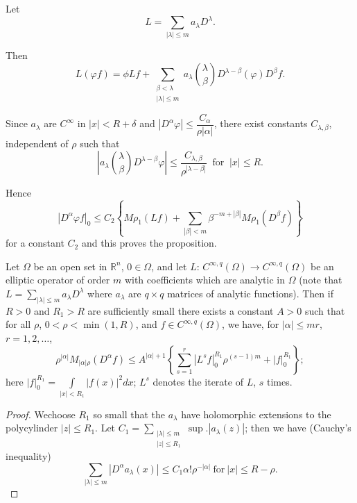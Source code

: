 Let\pageoriginale 
$$
L = \sum_{|\lambda| \leq m} a_\lambda D^\lambda.
$$ 

Then
$$
L(\varphi f ) = \phi Lf + \sum_{\substack{\beta < \lambda \\ | \lambda
    | \leq m}} a_\lambda \binom{\lambda}{\beta} D^ {\lambda - \beta}
(\varphi ) D^ \beta f . 
$$

Since $a_ \lambda$ are $C^ \infty$ in $| x | < R + \delta$ and $| D^
\alpha \varphi | \leq \dfrac{C_ \alpha}{\rho |\alpha|}$, there exist
constants $C_{\lambda , \beta}$, independent of $\rho$ such that 
$$
| a_ \lambda \binom{\lambda}{\beta} D^ {\lambda - \beta} \varphi | \leq
\frac{C_ {\lambda, \beta}}{\rho^{|\lambda- \beta|}} ~ \text{ for } ~
|x| \leq R. 
$$

Hence
$$
|D^ \alpha \varphi f |_0 \leq C_2 \left\{ M \rho_1 (Lf) + \sum_{|\beta| <
  m} \beta^{-m+ |\beta|} M \rho_1 (D^ \beta f) \right\} 
$$
for a constant $C_2$ and this proves the proposition.

\begin{proposition}\label{chap3:sec8:prop2}%
  Let $\Omega$ be an open set in $\mathbb{R}^n$, $0 \in \Omega$, and
  let $L$: $C^ {\infty , q} (\Omega ) \to C^{\infty, q} (\Omega)$ be
  an elliptic operator of order $m$ with coefficients which are
  analytic in $\Omega$ (note that $L = \sum\limits_{|\lambda| \leq m}
  a_\lambda D^ \lambda$ where $a_ \lambda$ are $q \times q$ matrices
  of analytic functions). Then if $R > 0$ and $R_1 > R$ are
  sufficiently small there exists a constant $A > 0$ such that for all
  $\rho$, $0 < \rho < \min (1, R)$, and $f \in C^{\infty , q} (\Omega
  )$, we have, for $| \alpha | \leq mr$, $r = 1, 2, \ldots$, 
  \begin{equation}
    \rho^{| \alpha |} M_{|\alpha | \rho} (D^\alpha f) \leq A^{|\alpha
      | + 1} \left\{ \sum^r_{s= 1} |L^s f |_0^{R_1} \rho^{(s-1)m} + |
    f|^{R_1}_0 \right\}; \tag{8.1}\label{chap3:sec8:eq8.1} 
  \end{equation} 
  here $|f|^{R_1}_0 = \int \limits_{|x|< R_1} | f(x) |^2 dx$; $L^s$
  denotes the iterate of $L$, $s$ times. 
\end{proposition}

\begin{proof}
  We\pageoriginale choose $R_1$ so small that the $a_\lambda$ have holomorphic
  extensions to the polycylinder $|z| \leq R_1$. Let $C_1 =
  \sum_{\substack{|\lambda|\leq m\\ | z | \leq R_1}} \sup . |a_
  \lambda (z) | $; then we have (Cauchy's inequality) 
  \begin{equation}
    \sum_{| \lambda | \leq m} | D^ \alpha a_ \lambda (x) | \leq C_1
    \alpha ! \rho^{-| \alpha |} ~\text{for} ~ |x| \leq R - \rho
    . \tag{8.2}\label{chap3:sec8:eq8.2} 
  \end{equation}
\end{proof}

